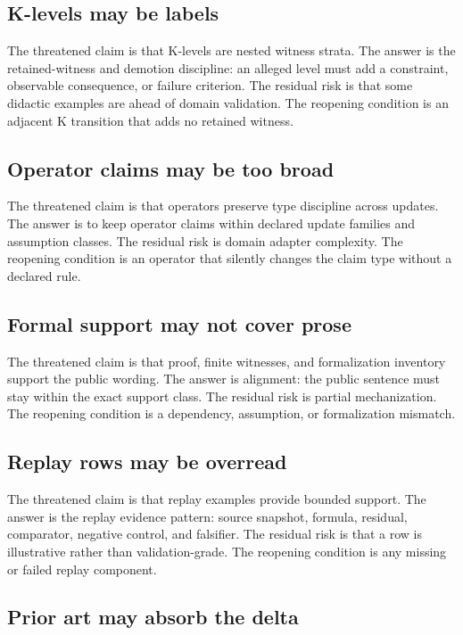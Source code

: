 \subsection{K-levels may be labels}

The threatened claim is that K-levels are nested witness strata. The answer is
the retained-witness and demotion discipline: an alleged level must add a
constraint, observable consequence, or failure criterion. The residual risk is
that some didactic examples are ahead of domain validation. The reopening
condition is an adjacent K transition that adds no retained witness.

\subsection{Operator claims may be too broad}

The threatened claim is that operators preserve type discipline across updates.
The answer is to keep operator claims within declared update families and
assumption classes. The residual risk is domain adapter complexity. The
reopening condition is an operator that silently changes the claim type without
a declared rule.

\subsection{Formal support may not cover prose}

The threatened claim is that proof, finite witnesses, and formalization
inventory support the public wording. The answer is alignment: the public
sentence must stay within the exact support class. The residual risk is partial
mechanization. The reopening condition is a dependency, assumption, or
formalization mismatch.

\subsection{Replay rows may be overread}

The threatened claim is that replay examples provide bounded support. The
answer is the replay evidence pattern: source snapshot, formula, residual,
comparator, negative control, and falsifier. The residual risk is that a row is
illustrative rather than validation-grade. The reopening condition is any
missing or failed replay component.

\subsection{Prior art may absorb the delta}

